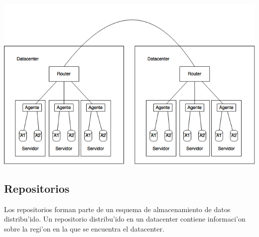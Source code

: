 \includegraphics[width=15cm]{diagramas/datacenterx2.png}

\subsection{Repositorios}

Los repositorios forman parte de un esquema de almacenamiento de datos distribu'ido. Un repositorio distribu'ido en un datacenter contiene informaci'on sobre la regi'on en la que se encuentra el datacenter.


